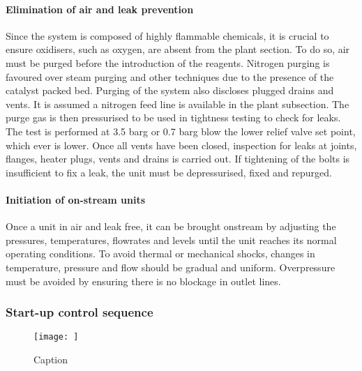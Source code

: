 \paragraph{Elimination of air and leak prevention}
Since the system is composed of highly flammable chemicals, it is crucial to ensure oxidisers, such as oxygen, are absent from the plant section. To do so, air must be purged before the introduction of the reagents. Nitrogen purging is favoured over steam purging and other techniques due to the presence of the catalyst packed bed. Purging of the system also discloses plugged drains and vents. It is assumed a nitrogen feed line is available in the plant subsection. 
The purge gas is then pressurised to be used in tightness testing to check for leaks. The test is performed at 3.5 barg or 0.7 barg blow the lower relief valve set point, which ever is lower. Once all vents have been closed, inspection for leaks at joints, flanges, heater plugs, vents and drains is carried out. If tightening of the bolts is insufficient to fix a leak, the unit must be depressurised, fixed and repurged.

\paragraph{Initiation of on-stream units}
Once a unit in air and leak free, it can be brought onstream by adjusting the pressures, temperatures, flowrates and levels until the unit reaches its normal operating conditions. To avoid thermal or mechanical shocks, changes in temperature, pressure and flow should be gradual and uniform. Overpressure must be avoided by ensuring there is no blockage in outlet lines.


\subsubsection{Start-up control sequence}
\begin{figure}[H]
    \centering
    \texttt{[image: ]}
    \caption{Caption}
    \label{fig:startup}
\end{figure}


